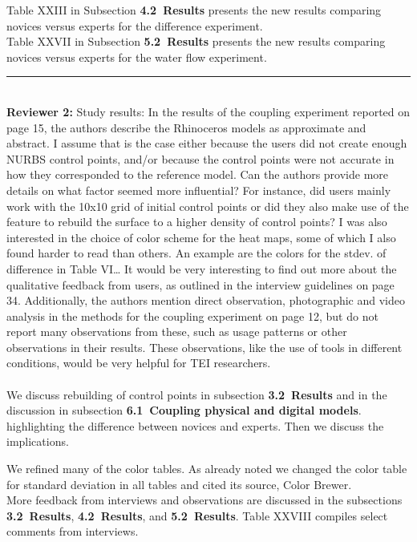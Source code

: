 \documentclass[prodmode,acmtochi]{acmsmall} %
\newcommand{\doublerule}[1][.4pt]{%
  \noindent
  \makebox[0pt][l]{\rule[.7ex]{\linewidth}{#1}}%
  \rule[.3ex]{\linewidth}{#1}}
\begin{document}
Table XXIII in Subsection \textbf{4.2~Results}
presents the new results comparing novices versus experts
for the difference experiment. \\

Table XXVII in Subsection \textbf{5.2~Results}
presents the new results comparing novices versus experts
for the water flow experiment.  \\

\doublerule \\

\textbf{Reviewer 2:}
Study results:
In the results of the coupling experiment reported on page 15, the authors describe the Rhinoceros models as approximate and abstract. I assume that is the case either because the users did not create enough NURBS control points, and/or because the control points were not accurate in how they corresponded to the reference model. Can the authors provide more details on what factor seemed more influential? For instance, did users mainly work with the 10x10 grid of initial control points or did they also make use of the feature to rebuild the surface to a higher density of control points?
I was also interested in the choice of color scheme for the heat maps, some of which I also found harder to read than others. An example are the colors for the stdev. of difference in Table VI\ldots
It would be very interesting to find out more about the qualitative feedback from users, as outlined in the interview guidelines on page 34. Additionally, the authors mention direct observation, photographic and video analysis in the methods for the coupling experiment on page 12, but do not report many observations from these, such as usage patterns or other observations in their results. These observations, like the use of tools in different conditions, would be very helpful for TEI researchers. \\

\hrulefill \\
We discuss rebuilding of control points in 
subsection \textbf{3.2~Results} 
and in the discussion in subsection 
\textbf{6.1~Coupling physical and digital models}.
highlighting the difference between novices and experts.
Then we discuss the implications. 

We refined many of the color tables. 
As already noted we changed the color table for standard deviation
in all tables and cited its source, Color Brewer.\\

More feedback from interviews and observations are discussed in the subsections \textbf{3.2~Results}, \textbf{4.2~Results}, and \textbf{5.2~Results}.
Table XXVIII compiles select comments from interviews. \\
\end{document}
